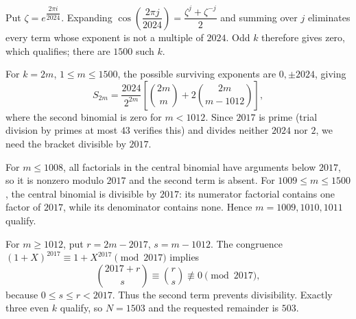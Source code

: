Put $\zeta=e^{\dfrac{2\pi i}{2024}}$. Expanding $\cos(\dfrac{2\pi j}{2024})=\dfrac{\zeta^j+\zeta^{-j}}{2}$ and summing over $j$ eliminates every term whose exponent is not a multiple of $2024$. Odd $k$ therefore gives zero, which qualifies; there are $1500$ such $k$.

For $k=2m$, $1\le m\le1500$, the possible surviving exponents are $0,\pm2024$, giving
\[
S_{2m}=\dfrac{2024}{2^{2m}}\left[\binom{2m}{m}+2\binom{2m}{m-1012}\right],
\]
where the second binomial is zero for $m<1012$. Since $2017$ is prime (trial division by primes at most $43$ verifies this) and divides neither $2024$ nor $2$, we need the bracket divisible by $2017$.

For $m\le1008$, all factorials in the central binomial have arguments below $2017$, so it is nonzero modulo $2017$ and the second term is absent. For $1009\le m\le1500$, the central binomial is divisible by $2017$: its numerator factorial contains one factor of $2017$, while its denominator contains none. Hence $m=1009,1010,1011$ qualify.

For $m\ge1012$, put $r=2m-2017$, $s=m-1012$. The congruence $(1+X)^{2017}\equiv1+X^{2017}\pmod{2017}$ implies
\[
\binom{2017+r}{s}\equiv\binom rs\not\equiv0\pmod{2017},
\]
because $0\le s\le r<2017$. Thus the second term prevents divisibility. Exactly three even $k$ qualify, so $N=1503$ and the requested remainder is $\boxed{503}$.

